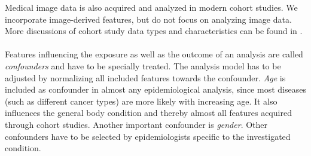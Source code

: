 \documentclass[journal]{style/vgtc} 			          %
\newcommand{\com}[1]{\textcolor{orange}{\uline{#1}}}
\begin{document}
Medical image data is also acquired and analyzed in modern cohort studies.
We incorporate image-derived features, but do not focus on analyzing image data.
More discussions of cohort study data types and characteristics can be found in \cite{Klemm2014VIS, Preim2014, Toennies2015}.
\\\\
Features influencing the exposure as well as the outcome of an analysis are called \emph{confounders} and have to be specially treated.
The analysis model has to be adjusted by normalizing all included features towards the confounder.
\emph{Age} is included as confounder in almost any epidemiological analysis, since most diseases (such as different cancer types) are more likely with increasing age.
It also influences the general body condition and thereby almost all features acquired through cohort studies.
Another important confounder is \emph{gender}.
Other confounders have to be selected by epidemiologists specific to the investigated condition.
\end{document}
